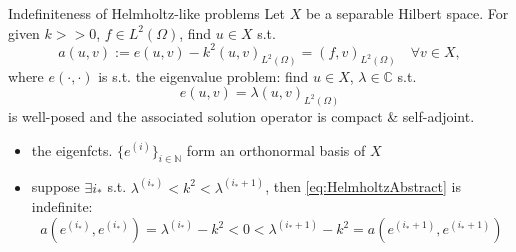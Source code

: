 \documentclass[11pt,aspectratio=169,xcolor=dvipsnames]{beamer}
\newcommand{\ei}{e^{(i)}}
\newcommand{\nicearrow}[2]{\raisebox{#2}{\resizebox{0.45cm}{!}{\color{#1}{\MVRightArrow}\color{black}}}}
\begin{document}
\begin{frame}{Indefiniteness of Helmholtz-like problems}
  Let $X$ be a separable Hilbert space. For given $k >\!\!> 0$, $f \in L^2(\Omega)$, find $u \in X$ s.t. 
  \begin{equation}\label{eq:HelmholtzAbstract}
    a(u,v) := e(u,v) - k^2(u,v)_{L^2(\Omega)} = (f,v)_{L^2(\Omega)} \quad \forall v \in X, \tag{P}
  \end{equation}
  where $e(\cdot,\cdot)$ is s.t. the eigenvalue problem: find $u \in X$, $\lambda \in \mathbb{C}$ s.t. 
  \begin{equation*}
    e(u,v) = \lambda (u,v)_{L^2(\Omega)}
  \end{equation*}
  is well-posed and the associated solution operator is compact \& self-adjoint. 
  \begin{itemize}
    \item<2->[\nicearrow{GOE}{-0.07cm}] the eigenfcts. $\{ \ei \}_{i \in \mathbb{N}}$ form an orthonormal basis of $X$
    \item<3->[\nicearrow{GOE}{-0.07cm}] suppose $\exists i_{\ast}$ s.t. $\lambda^{(i_{\ast})} < k^2 < \lambda^{(i_{\ast} + 1)}$, then \eqref{eq:HelmholtzAbstract} is indefinite: 
    \begin{equation*}
      a(e^{(i_{\ast})},e^{(i_{\ast})}) = \lambda^{(i_{\ast})} - k^2 < 0 <  \lambda^{(i_{\ast}+1)} - k^2 = a(e^{(i_{\ast} + 1)},e^{(i_{\ast} + 1)})
    \end{equation*}
  \end{itemize}
\end{frame}
\end{document}
